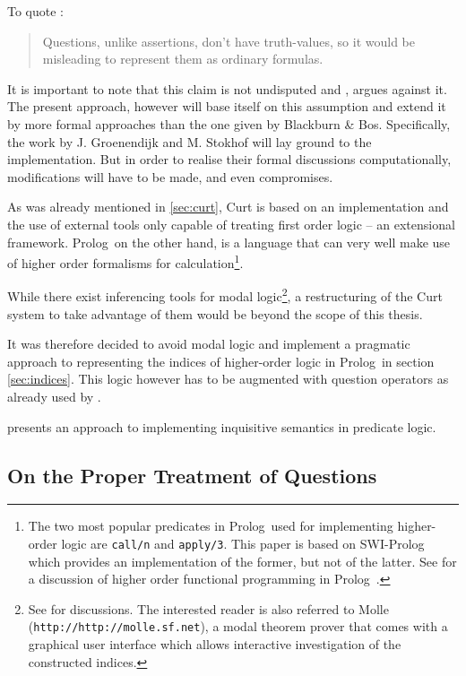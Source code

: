 \documentclass[12pt,a4paper]{article}
\newcommand{\code}{\texttt} %
\newcommand{\pn}{\textsf} %
\newcommand{\url}[1]{\code{http://#1}} %
\newcommand{\prol}{\pn{Prolog}\mbox{ }}
\theoremstyle{remark} \newtheorem*{termin}{Definition} %
\begin{document}
To quote \cite{blackburnbos:cl1}:

\begin{quote}
  Questions, unlike assertions, don't have truth-values, so it would be
  misleading to represent them as ordinary formulas.
\end{quote}

It is important to note that this claim is not undisputed and
\cite{karttunen:1977}, argues against it. The present approach, however will
base itself on this assumption and extend it by more formal approaches than the
one given by Blackburn \& Bos. Specifically, the work by J. Groenendijk and M. Stokhof
will lay ground to the implementation. But in order to realise their formal
discussions computationally, modifications will have to be made, and even
compromises.

As was already mentioned in \ref{sec:curt}, Curt is based on an
implementation and the use of external tools only capable of treating first
order logic – an extensional framework. \prol on the other hand, is a language
that can very well make use of higher order formalisms for
calculation\footnote{The two most popular predicates in \prol used for
implementing higher-order logic are
\code{call/n} and \code{apply/3}. This paper is based on \pn{SWI-Prolog} which
provides an implementation of the former, but not of the latter. See
\cite{naish:prolhio} for a discussion of higher order functional programming in
\prol.}.

While there exist inferencing tools for modal logic\footnote{See %
for discussions. The interested reader is also referred to \pn{Molle}
(\url{http://molle.sf.net}), a modal theorem prover that comes with a graphical user
interface which allows interactive investigation of the constructed indices.},
a restructuring of the \pn{Curt} system to take advantage of them would be
beyond the scope of this thesis.

It was therefore decided to avoid modal logic and implement a pragmatic approach
to representing the indices of higher-order logic in \prol in section
\ref{sec:indices}. This logic however has to be augmented with question
operators as already used by \cite{karttunen:1977}. %

\cite{g:is} presents an approach to implementing inquisitive semantics in
predicate logic.

\subsection{On the Proper Treatment of Questions}
\end{document}
